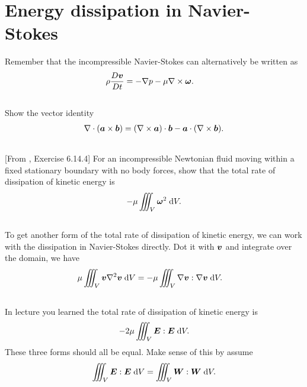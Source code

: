 \documentclass[11pt,letterpaper]{article}
\begin{document}
\section{Energy dissipation in Navier-Stokes}
Remember that the incompressible Navier-Stokes can alternatively be written as
\begin{align}
    \rho\frac{D\boldsymbol{v}}{Dt} &= -\nabla p-\mu\nabla\times\boldsymbol{\omega}.
\end{align}

\subsection{}
Show the vector identity
\begin{align}
    \nabla\cdot(\boldsymbol{a}\times\boldsymbol{b}) = (\nabla\times\boldsymbol{a})\cdot\boldsymbol{b}-\boldsymbol{a}\cdot(\nabla\times\boldsymbol{b}).
\end{align}

\subsection{}
[From \cite{Aris_62}, Exercise 6.14.4] For an incompressible Newtonian fluid moving within a fixed stationary boundary with no body forces, show that the total rate of dissipation of kinetic energy is
\begin{align}
    -\mu \iiint_V \boldsymbol{\omega}^2 \;\mathrm{d} V.
\end{align}

\subsection{}
To get another form of the total rate of dissipation of kinetic energy, we can work with the dissipation in Navier-Stokes directly. Dot it with $\boldsymbol{v}$ and integrate over the domain, we have
\begin{align}
    \mu \iiint_V \boldsymbol{v}\nabla^2\boldsymbol{v} \;\mathrm{d} V &= -\mu \iiint_V \nabla \boldsymbol{v}:\nabla\boldsymbol{v} \;\mathrm{d} V.
\end{align}

\subsection{}
In lecture you learned the total rate of dissipation of kinetic energy is
\begin{align}
    -2\mu \iiint_V \boldsymbol{E}:\boldsymbol{E} \;\mathrm{d} V.
\end{align}
These three forms should all be equal. Make sense of this by assume 
\begin{align}
    \iiint_V \boldsymbol{E}:\boldsymbol{E} \;\mathrm{d} V = \iiint_V \boldsymbol{W}:\boldsymbol{W} \;\mathrm{d} V.\label{eq:EW_ident}
\end{align}
\end{document}
